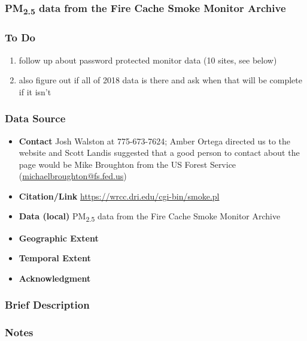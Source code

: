 \clearpage
\subsubsection{\texorpdfstring{PM\textsubscript{2.5}}{} data from the Fire Cache Smoke Monitor Archive}

\subsubsection*{To Do}

\begin{enumerate}
\item follow up about password protected monitor data (10 sites, see below)
\item also figure out if all of 2018 data is there and ask when that will be complete if it isn't
\end{enumerate}

\subsubsection*{Data Source}

\begin{itemize}[nolistsep]
\item \textbf{Contact} Josh Walston at 775-673-7624; Amber Ortega directed us to the website and Scott Landis suggested that a good person to contact about the page would be Mike Broughton from the US Forest Service (\url{michaelbroughton@fs.fed.us})
\item \textbf{Citation/Link} \url{https://wrcc.dri.edu/cgi-bin/smoke.pl}
\item \textbf{Data (local)} PM\textsubscript{2.5} data from the Fire Cache Smoke Monitor Archive
\item \textbf{Geographic Extent}
\item \textbf{Temporal Extent}
\item \textbf{Acknowledgment}
\end{itemize}

\subsubsection*{Brief Description}

\subsubsection*{Notes}


